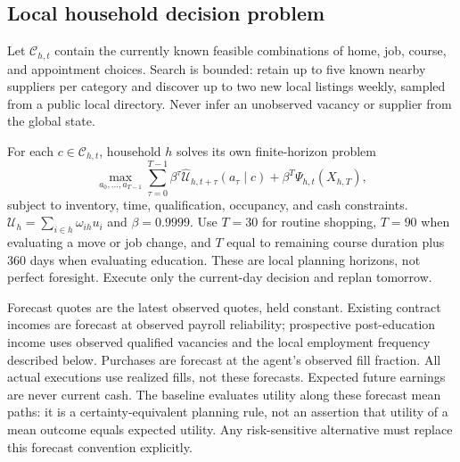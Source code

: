 \documentclass[10pt,a4paper,twocolumn]{article}
\newcommand{\C}{\mathcal C}
\newcommand{\U}{\mathcal U}
\begin{document}
\subsection{Local household decision problem}
Let $\C_{h,t}$ contain the currently known feasible combinations of
home, job, course, and appointment choices. Search is bounded: retain up
to five known nearby suppliers per category and discover up to two new
local listings weekly, sampled from a public local directory. Never
infer an unobserved vacancy or supplier from the global state.

For each $c\in\C_{h,t}$, household $h$ solves its own finite-horizon
problem
\begin{equation}
 \max_{a_0,\ldots,a_{T-1}}
 \sum_{\tau=0}^{T-1}\beta^\tau
 \widehat{\U}_{h,t+\tau}(a_\tau\mid c)
 +\beta^T\Psi_{h,t}(X_{h,T}),
 \label{eq:hhplan}
\end{equation}
subject to inventory, time, qualification, occupancy, and cash
constraints. $\U_h=\sum_{i\in h}\omega_{ih}u_i$ and $\beta=0.9999$.
Use $T=30$ for routine shopping, $T=90$ when evaluating a move or job
change, and $T$ equal to remaining course duration plus 360 days when
evaluating education. These are local planning horizons, not perfect
foresight. Execute only the current-day decision and replan tomorrow.

Forecast quotes are the latest observed quotes, held constant. Existing
contract incomes are forecast at observed payroll reliability; prospective
post-education income uses observed qualified vacancies and the local
employment frequency described below. Purchases are forecast at the
agent's observed fill fraction. All actual executions use realized fills,
not these forecasts. Expected future earnings are never current cash.
The baseline evaluates utility along these forecast mean paths: it is a
certainty-equivalent planning rule, not an assertion that utility of a
mean outcome equals expected utility. Any risk-sensitive alternative
must replace this forecast convention explicitly.
\end{document}
